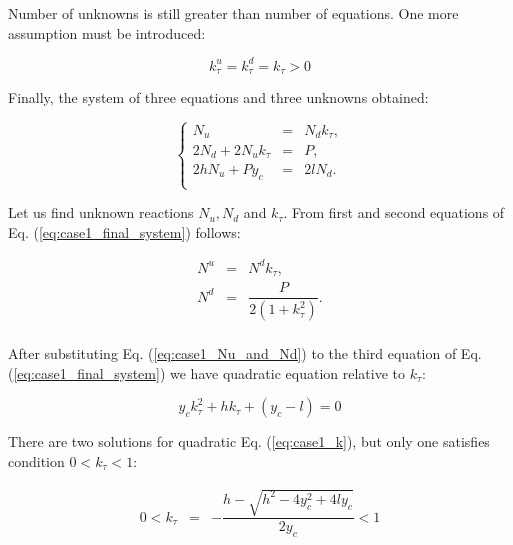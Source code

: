 \documentclass{ws-procs9x6}
\begin{document}
Number of unknowns is still greater than number of equations. One more assumption must be introduced:

\begin{equation}
  \label{eq:case1_assumption_3}
  k_\tau^u = k_\tau^d = k_\tau > 0
\end{equation}

Finally, the system of three equations and three unknowns obtained:

\begin{equation}
\label{eq:case1_final_system}
\left\{
\begin{array}{rcl}
  N_u &=& N_dk_\tau,\\  
  2N_d + 2N_uk_\tau &=& P,\\
  2hN_u + Py_c &=& 2lN_d.\\
\end{array}
\right.
\end{equation}

Let us find unknown reactions $N_u,N_d$ and $k_\tau$. From first and second equations of Eq. (\ref{eq:case1_final_system}) follows:

\begin{equation}
\label{eq:case1_Nu_and_Nd}
\begin{array}{rcl}
  N^u &=& N^dk_\tau,\\
  N^d &=& \dfrac{P}{2(1+k_\tau^2)}.\\
\end{array}
\end{equation}

After substituting Eq. (\ref{eq:case1_Nu_and_Nd}) to the third equation of Eq. (\ref{eq:case1_final_system}) we have quadratic equation relative to $k_\tau$:

\begin{equation}
\label{eq:case1_k}
y_ck_\tau^2+hk_\tau + (y_c-l) = 0
\end{equation}

There are two solutions for quadratic Eq. (\ref{eq:case1_k}), but only one satisfies condition $0<k_\tau<1$:

\begin{equation}
\label{eq:case1_k12}
\begin{array}{rcl}
 0 < k_\tau &=& -\dfrac{h - \sqrt{h^2 - 4y_c^2 + 4ly_c}}{2y_c} < 1\\
\end{array}
\end{equation}
\end{document}

